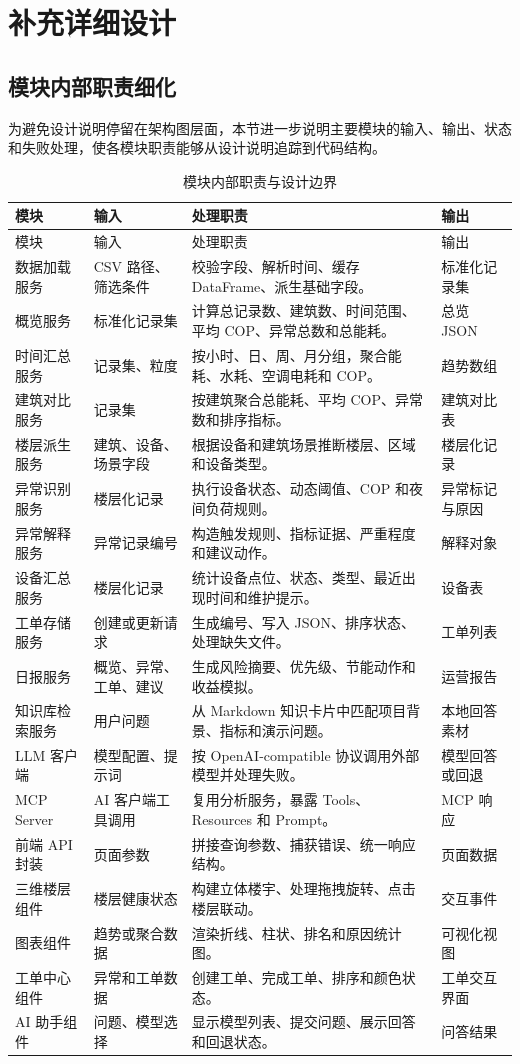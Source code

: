 \documentclass[12pt,a4paper]{ctexart}
\begin{document}
\clearpage
\section{补充详细设计}
\subsection{模块内部职责细化}
为避免设计说明停留在架构图层面，本节进一步说明主要模块的输入、输出、状态和失败处理，使各模块职责能够从设计说明追踪到代码结构。
\begin{longtable}{L{3.4cm}L{3.8cm}L{4.8cm}L{3.1cm}}
\caption{模块内部职责与设计边界}\\
\toprule
模块 & 输入 & 处理职责 & 输出 \\
\midrule
\endfirsthead
\toprule
模块 & 输入 & 处理职责 & 输出 \\
\midrule
\endhead
数据加载服务 & CSV 路径、筛选条件 & 校验字段、解析时间、缓存 DataFrame、派生基础字段。 & 标准化记录集 \\
概览服务 & 标准化记录集 & 计算总记录数、建筑数、时间范围、平均 COP、异常总数和总能耗。 & 总览 JSON \\
时间汇总服务 & 记录集、粒度 & 按小时、日、周、月分组，聚合能耗、水耗、空调电耗和 COP。 & 趋势数组 \\
建筑对比服务 & 记录集 & 按建筑聚合总能耗、平均 COP、异常数和排序指标。 & 建筑对比表 \\
楼层派生服务 & 建筑、设备、场景字段 & 根据设备和建筑场景推断楼层、区域和设备类型。 & 楼层化记录 \\
异常识别服务 & 楼层化记录 & 执行设备状态、动态阈值、COP 和夜间负荷规则。 & 异常标记与原因 \\
异常解释服务 & 异常记录编号 & 构造触发规则、指标证据、严重程度和建议动作。 & 解释对象 \\
设备汇总服务 & 楼层化记录 & 统计设备点位、状态、类型、最近出现时间和维护提示。 & 设备表 \\
工单存储服务 & 创建或更新请求 & 生成编号、写入 JSON、排序状态、处理缺失文件。 & 工单列表 \\
日报服务 & 概览、异常、工单、建议 & 生成风险摘要、优先级、节能动作和收益模拟。 & 运营报告 \\
知识库检索服务 & 用户问题 & 从 Markdown 知识卡片中匹配项目背景、指标和演示问题。 & 本地回答素材 \\
LLM 客户端 & 模型配置、提示词 & 按 OpenAI-compatible 协议调用外部模型并处理失败。 & 模型回答或回退 \\
MCP Server & AI 客户端工具调用 & 复用分析服务，暴露 Tools、Resources 和 Prompt。 & MCP 响应 \\
前端 API 封装 & 页面参数 & 拼接查询参数、捕获错误、统一响应结构。 & 页面数据 \\
三维楼层组件 & 楼层健康状态 & 构建立体楼宇、处理拖拽旋转、点击楼层联动。 & 交互事件 \\
图表组件 & 趋势或聚合数据 & 渲染折线、柱状、排名和原因统计图。 & 可视化视图 \\
工单中心组件 & 异常和工单数据 & 创建工单、完成工单、排序和颜色状态。 & 工单交互界面 \\
AI 助手组件 & 问题、模型选择 & 显示模型列表、提交问题、展示回答和回退状态。 & 问答结果 \\
\bottomrule
\end{longtable}
\end{document}
